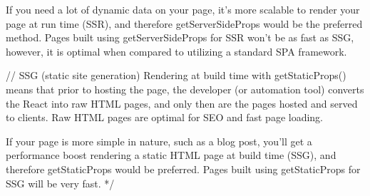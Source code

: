 If you need a lot of dynamic data on your page, 
it’s more scalable to render your page at run time (SSR), 
and therefore getServerSideProps would be the preferred method.  
Pages built using getServerSideProps for SSR won’t be as fast as SSG, 
however, it is optimal when compared to utilizing a standard SPA framework.

// SSG (static site generation)
Rendering at build time with getStaticProps() means that prior to hosting the page, 
the developer (or automation tool) converts the React into raw HTML pages, 
and only then are the pages hosted and served to clients. 
Raw HTML pages are optimal for SEO and fast page loading.

If your page is more simple in nature, such as a blog post, 
you’ll get a performance boost rendering a static HTML page at build time (SSG), 
and therefore getStaticProps would be preferred. 
Pages built using getStaticProps for SSG will be very fast.
 */
